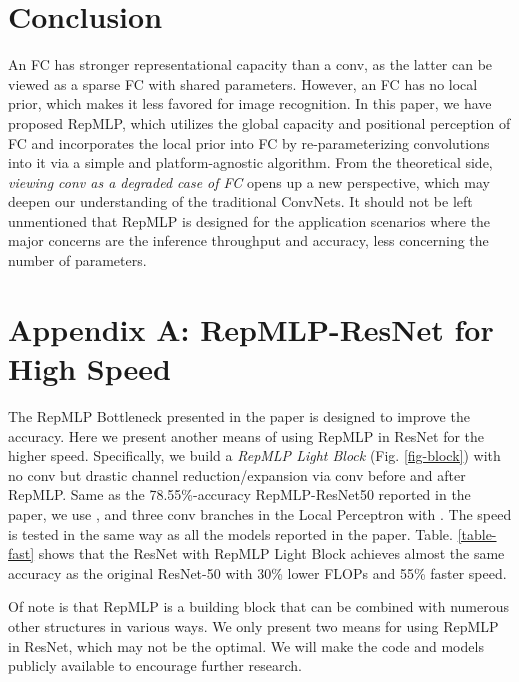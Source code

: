 \documentclass[10pt,twocolumn,letterpaper]{article}
\begin{document}
\section{Conclusion}

An FC has stronger representational capacity than a conv, as the latter can be viewed as a sparse FC with shared parameters. However, an FC has no local prior, which makes it less favored for image recognition. In this paper, we have proposed RepMLP, which utilizes the global capacity and positional perception of FC and incorporates the local prior into FC by re-parameterizing convolutions into it via a simple and platform-agnostic algorithm. From the theoretical side, \textit{viewing conv as a degraded case of FC} opens up a new perspective, which may deepen our understanding of the traditional ConvNets. It should not be left unmentioned that RepMLP is designed for the application scenarios where the major concerns are the inference throughput and accuracy, less concerning the number of parameters.



 










{\small


}

\clearpage

\section*{Appendix A: RepMLP-ResNet for High Speed}

The RepMLP Bottleneck presented in the paper is designed to improve the accuracy. Here we present another means of using RepMLP in ResNet for the higher speed. Specifically, we build a \textit{RepMLP Light Block} (Fig. \ref{fig-block}) with no  conv but drastic  channel reduction/expansion via  conv before and after RepMLP. Same as the 78.55\%-accuracy RepMLP-ResNet50 reported in the paper, we use ,  and three conv branches in the Local Perceptron with . The speed is tested in the same way as all the models reported in the paper. Table. \ref{table-fast} shows that the ResNet with RepMLP Light Block achieves almost the same accuracy as the original ResNet-50 with 30\% lower FLOPs and 55\% faster speed.

Of note is that RepMLP is a building block that can be combined with numerous other structures in various ways. We only present two means for using RepMLP in ResNet, which may not be the optimal. We will make the code and models publicly available to encourage further research.
\end{document}
